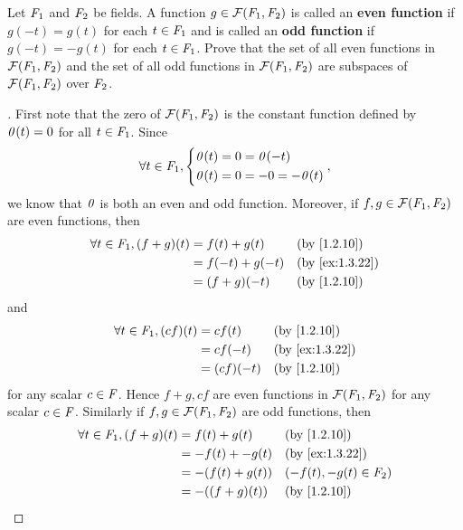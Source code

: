 \begin{ex}\label{ex:1.3.22}
	Let \(\mathit{F}_1\) and \(\mathit{F}_2\) be fields.
	A function \(g \in \mathcal{F}(\mathit{F}_1, \mathit{F}_2)\) is called an \textbf{even function} if \(g(-t) = g(t)\) for each \(t \in \mathit{F}_1\) and is called an \textbf{odd function} if \(g(-t) = -g(t)\) for each \(t \in \mathit{F}_1\).
	Prove that the set of all even functions in \(\mathcal{F}(\mathit{F}_1, \mathit{F}_2)\) and the set of all odd functions in \(\mathcal{F}(\mathit{F}_1, \mathit{F}_2)\) are subspaces of \(\mathcal{F}(\mathit{F}_1, \mathit{F}_2)\) over \(\mathit{F}_2\).
\end{ex}

\begin{proof}[]
	First note that the zero of \(\mathcal{F}(\mathit{F}_1, \mathit{F}_2)\) is the constant function defined by \(\mathit{0}(t) = 0\) for all \(t \in \mathit{F}_1\).
	Since
	\[
		\forall t \in \mathit{F}_1, \begin{dcases}
			\mathit{0}(t) = 0 = \mathit{0}(-t) \\
			\mathit{0}(t) = 0 = -0 = -\mathit{0}(t)
		\end{dcases},
	\]
	we know that \(\mathit{0}\) is both an even and odd function.
	Moreover, if \(f, g \in \mathcal{F}(\mathit{F}_1, \mathit{F}_2)\) are even functions, then
	\begin{align*}
		\forall t \in \F_1, (f + g)(t) & = f(t) + g(t)   &  & \by{1.2.10}    \\
		                               & = f(-t) + g(-t) &  & \by{ex:1.3.22} \\
		                               & = (f + g)(-t)   &  & \by{1.2.10}
	\end{align*}
	and
	\begin{align*}
		\forall t \in \F_1, (cf)(t) & = cf(t)    &  & \by{1.2.10}    \\
		                            & = cf(-t)   &  & \by{ex:1.3.22} \\
		                            & = (cf)(-t) &  & \by{1.2.10}
	\end{align*}
	for any scalar \(c \in \mathit{F}\).
	Hence \(f + g, cf\) are even functions in \(\mathcal{F}(\mathit{F}_1, \mathit{F}_2)\) for any scalar \(c \in \mathit{F}\).
	Similarly if \(f, g \in \mathcal{F}(\mathit{F}_1, \mathit{F}_2)\) are odd functions, then
	\begin{align*}
		\forall t \in \F_1, (f + g)(t) & = f(t) + g(t)    &  & \by{1.2.10}             \\
		                               & = -f(t) + -g(t)  &  & \by{ex:1.3.22}          \\
		                               & = -(f(t) + g(t)) &  & (-f(t), -g(t) \in \F_2) \\
		                               & = -((f + g)(t))  &  & \by{1.2.10}             \\

\end{align*}
\end{proof}

